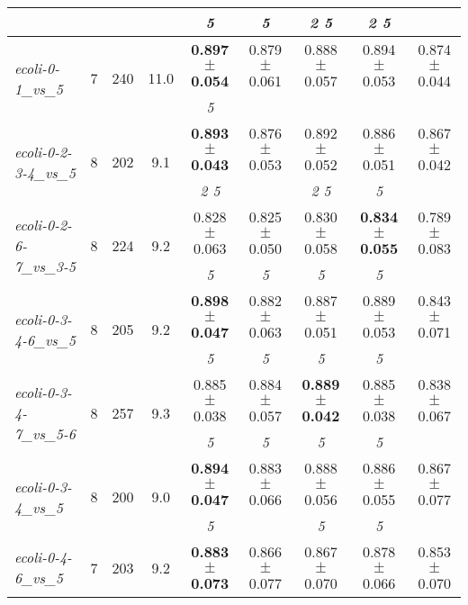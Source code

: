 \begin{table}[ht]
{\begin{tabular}{lcccccccc}
 & & &  & \textit{5 } & \textit{5 } & \textit{2 5 } & \textit{2 5 } & \textit{} \\ \bottomrule
\multirow{2}{*}{\textit{ecoli-0-1\_vs\_5}} & \multirow{2}{*}{7} & \multirow{2}{*}{240} & \multirow{2}{*}{11.0} & \textbf{0.897 $\pm$ 0.054} & 0.879 $\pm$ 0.061 & 0.888 $\pm$ 0.057 & 0.894 $\pm$ 0.053 & 0.874 $\pm$ 0.044 \\
 & & &  & \textit{5 } & \textit{} & \textit{} & \textit{} & \textit{} \\ \bottomrule
\multirow{2}{*}{\textit{ecoli-0-2-3-4\_vs\_5}} & \multirow{2}{*}{8} & \multirow{2}{*}{202} & \multirow{2}{*}{9.1} & \textbf{0.893 $\pm$ 0.043} & 0.876 $\pm$ 0.053 & 0.892 $\pm$ 0.052 & 0.886 $\pm$ 0.051 & 0.867 $\pm$ 0.042 \\
 & & &  & \textit{2 5 } & \textit{} & \textit{2 5 } & \textit{5 } & \textit{} \\ \bottomrule
\multirow{2}{*}{\textit{ecoli-0-2-6-7\_vs\_3-5}} & \multirow{2}{*}{8} & \multirow{2}{*}{224} & \multirow{2}{*}{9.2} & 0.828 $\pm$ 0.063 & 0.825 $\pm$ 0.050 & 0.830 $\pm$ 0.058 & \textbf{0.834 $\pm$ 0.055} & 0.789 $\pm$ 0.083 \\
 & & &  & \textit{5 } & \textit{5 } & \textit{5 } & \textit{5 } & \textit{} \\ \bottomrule
\multirow{2}{*}{\textit{ecoli-0-3-4-6\_vs\_5}} & \multirow{2}{*}{8} & \multirow{2}{*}{205} & \multirow{2}{*}{9.2} & \textbf{0.898 $\pm$ 0.047} & 0.882 $\pm$ 0.063 & 0.887 $\pm$ 0.051 & 0.889 $\pm$ 0.053 & 0.843 $\pm$ 0.071 \\
 & & &  & \textit{5 } & \textit{5 } & \textit{5 } & \textit{5 } & \textit{} \\ \bottomrule
\multirow{2}{*}{\textit{ecoli-0-3-4-7\_vs\_5-6}} & \multirow{2}{*}{8} & \multirow{2}{*}{257} & \multirow{2}{*}{9.3} & 0.885 $\pm$ 0.038 & 0.884 $\pm$ 0.057 & \textbf{0.889 $\pm$ 0.042} & 0.885 $\pm$ 0.038 & 0.838 $\pm$ 0.067 \\
 & & &  & \textit{5 } & \textit{5 } & \textit{5 } & \textit{5 } & \textit{} \\ \bottomrule
\multirow{2}{*}{\textit{ecoli-0-3-4\_vs\_5}} & \multirow{2}{*}{8} & \multirow{2}{*}{200} & \multirow{2}{*}{9.0} & \textbf{0.894 $\pm$ 0.047} & 0.883 $\pm$ 0.066 & 0.888 $\pm$ 0.056 & 0.886 $\pm$ 0.055 & 0.867 $\pm$ 0.077 \\
 & & &  & \textit{5 } & \textit{} & \textit{5 } & \textit{5 } & \textit{} \\ \bottomrule
\multirow{2}{*}{\textit{ecoli-0-4-6\_vs\_5}} & \multirow{2}{*}{7} & \multirow{2}{*}{203} & \multirow{2}{*}{9.2} & \textbf{0.883 $\pm$ 0.073} & 0.866 $\pm$ 0.077 & 0.867 $\pm$ 0.070 & 0.878 $\pm$ 0.066 & 0.853 $\pm$ 0.070 \\

\end{tabular}}
\end{table}
